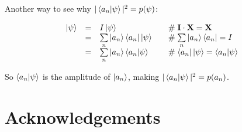 \documentclass[11pt, oneside]{article}   	%
\begin{document}
\bigskip
\noindent
Another way to see why $|\braket{a_n | \psi}|^2 = p(\psi)$:


\begin{equation*}
\begin{array}{rcll}
\ket{\psi}
&=& I \ket{\psi}                                                                                                   & \quad \mathrel{\#}  \mathbf{I} \cdot \mathbf{X} = \mathbf{X} \\
&=& \sum\limits_{n} \ket{a_n} \bra{a_n} \ket{\psi}                                              & \quad \mathrel{\#} \sum\limits_{n} \ket{a_n} \bra{a_n} = I \\
&=& \sum\limits_{n} \ket{a_n} \braket{a_n | \psi}                                               & \quad \mathrel{\#} \bra{a_n} \ket{\psi} = \braket{a_n | \psi} 
\end{array}
\end{equation*}

\bigskip
\noindent
So $\braket{a_n | \psi}$ is the amplitude of $\ket{a_n}$, making $| \braket{a_n | \psi} |^2 = p(a_n)$.

\bigskip
\section{Acknowledgements}

\newpage


\end{document}
